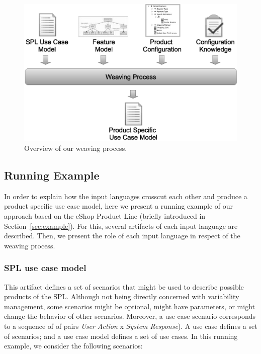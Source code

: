 \documentclass{acm_proc_article-sp}
\begin{document}

\begin{figure}[h]
 \begin{center}
  \includegraphics[scale=0.30]{img/weave-process2.eps}
  \caption{Overview of our weaving process.}
  \label{fig:weave-process}
  \end{center}
\end{figure}

\subsection{Running Example}
\label{sub:running}

In order to explain how the input languages crosscut each other and produce a product specific use case model, here we present a 
running example of our approach based on the eShop Product Line (briefly introduced in Section~\ref{sec:example}). For this, several artifacts of each 
input language are described. Then, we present the role of each input language in respect of the weaving process.


\subsubsection{SPL use case model}

This artifact defines a set of scenarios that might be used to describe possible products of the SPL. Although not being directly concerned 
with variability management, some scenarios might be optional, 
might have parameters, or might change the behavior of other 
scenarios. Moreover, a use case scenario corresponds to a sequence of
of pairs \emph{User Action} x \emph{System Response}).  A use case defines a set of scenarios; and a use case model defines a set of use cases. In this running example, we consider the following scenarios:
\end{document}
